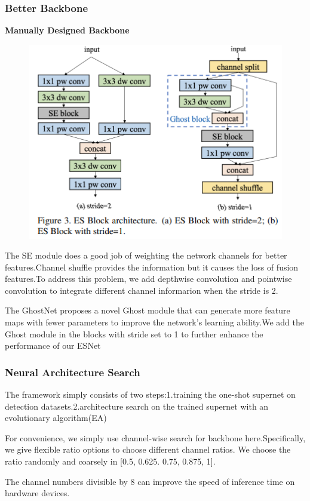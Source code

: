 \documentclass[11pt]{article}
\begin{document}
\subsubsection{Better Backbone}
 \textbf{Manually Designed Backbone}
 \begin{figure}[H]
 	\centering
 	\includegraphics[scale = 0.35]{93}
 \end{figure}
The SE module does a good job of weighting the network channels for better features.Channel shuffle provides the information but it causes the loss of fusion features.To address this problem, we add depthwise convolution and pointwise convolution to integrate different channel informarion when the stride is 2.

The GhostNet proposes a novel Ghost module that can generate more feature maps with fewer parameters to improve the network's learning ability.We add the Ghost module in the blocks with stride set to 1 to further enhance the performance of our ESNet

\subsubsection{Neural Architecture Search}
The framework simply consists of two steps:1.training the one-shot supernet on detection datasets.2.architecture search on the trained supernet with an evolutionary algorithm(EA)

For convenience, we simply use channel-wise search for backbone here.Specifically, we give flexible ratio options to choose different channel ratios. We choose the ratio randomly and coarsely in [0.5, 0.625. 0.75, 0.875, 1].

The channel numbers divisible by 8 can improve the speed of inference time on hardware devices.
\end{document}
